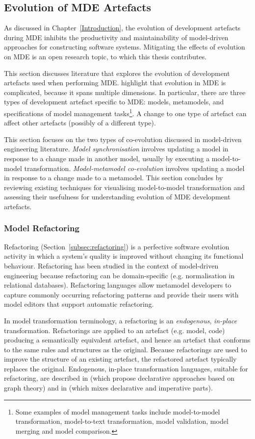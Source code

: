 \subsection{Evolution of MDE Artefacts}
\label{subsec:mde_evo}
As discussed in Chapter~\ref{Introduction}, the evolution of development artefacts during MDE inhibits the productivity and maintainability of model-driven approaches for constructing software systems. Mitigating the effects of evolution on MDE is an open research topic, to which this thesis contributes.

This section discusses literature that explores the evolution of development artefacts used when performing MDE. \cite{deursen07mdse} highlight that evolution in MDE is complicated, because it spans multiple dimensions. In particular, there are three types of development artefact specific to MDE: models, metamodels, and specifications of model management tasks\footnote{Some examples of model management tasks include model-to-model transformation, model-to-text transformation, model validation, model merging and model comparison.}. A change to one type of artefact can affect other artefacts (possibly of a different type). 

This section focuses on the two types of co-evolution discussed in model-driven engineering literature. \emph{Model synchronisation} involves updating a model in response to a change made in another model, usually by executing a model-to-model transformation. \emph{Model-metamodel co-evolution} involves updating a model in response to a change made to a metamodel. This section concludes by reviewing existing techniques for visualising model-to-model transformation and assessing their usefulness for understanding evolution of MDE development artefacts. 

\subsubsection{Model Refactoring}
Refactoring (Section~\ref{subsec:refactoring}) is a perfective software evolution activity in which a system's quality is improved without changing its functional behaviour.  Refactoring has been studied in the context of model-driven engineering because refactoring can be domain-specific (e.g. normalisation in relational databases). Refactoring languages allow metamodel developers to capture commonly occurring refactoring patterns and provide their users with model editors that support automatic refactoring. 

In model transformation terminology, a refactoring is an \emph{endogenous}, \emph{in-place} transformation. Refactorings are applied to an artefact (e.g. model, code) producing a semantically equivalent artefact, and hence an artefact that conforms to the same rules and structures as the original. Because refactorings are used to improve the structure of an existing artefact, the refactored artefact typically replaces the original. Endogenous, in-place transformation languages, suitable for refactoring, are described in \cite{biermann06refactoring,porres03refactoring} (which propose declarative approaches based on graph theory) and in \cite{kolovos07ewl} (which mixes declarative and imperative parts).

